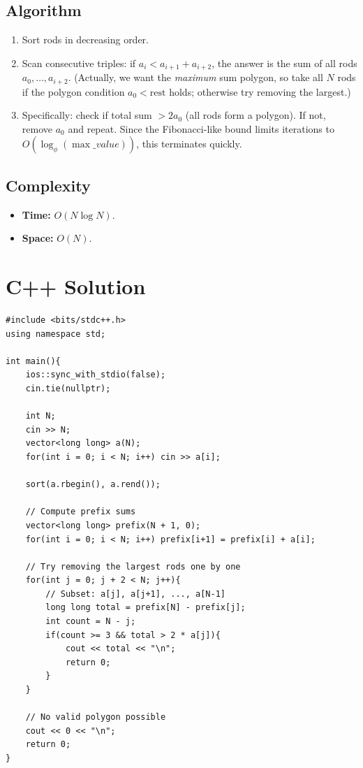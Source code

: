 \documentclass[11pt,a4paper]{article}
\begin{document}
\subsection{Algorithm}
\begin{enumerate}
    \item Sort rods in decreasing order.
    \item Scan consecutive triples: if $a_i < a_{i+1} + a_{i+2}$, the answer is the sum of all rods $a_0, \ldots, a_{i+2}$. (Actually, we want the \emph{maximum} sum polygon, so take all $N$ rods if the polygon condition $a_0 < \text{rest}$ holds; otherwise try removing the largest.)
    \item Specifically: check if total sum $> 2 a_0$ (all rods form a polygon). If not, remove $a_0$ and repeat. Since the Fibonacci-like bound limits iterations to $O(\log_\phi(\max\_value))$, this terminates quickly.
\end{enumerate}

\subsection{Complexity}
\begin{itemize}
    \item \textbf{Time:} $O(N \log N)$.
    \item \textbf{Space:} $O(N)$.
\end{itemize}

\section{C++ Solution}

\begin{lstlisting}
#include <bits/stdc++.h>
using namespace std;

int main(){
    ios::sync_with_stdio(false);
    cin.tie(nullptr);

    int N;
    cin >> N;
    vector<long long> a(N);
    for(int i = 0; i < N; i++) cin >> a[i];

    sort(a.rbegin(), a.rend());

    // Compute prefix sums
    vector<long long> prefix(N + 1, 0);
    for(int i = 0; i < N; i++) prefix[i+1] = prefix[i] + a[i];

    // Try removing the largest rods one by one
    for(int j = 0; j + 2 < N; j++){
        // Subset: a[j], a[j+1], ..., a[N-1]
        long long total = prefix[N] - prefix[j];
        int count = N - j;
        if(count >= 3 && total > 2 * a[j]){
            cout << total << "\n";
            return 0;
        }
    }

    // No valid polygon possible
    cout << 0 << "\n";
    return 0;
}
\end{lstlisting}
\end{document}
